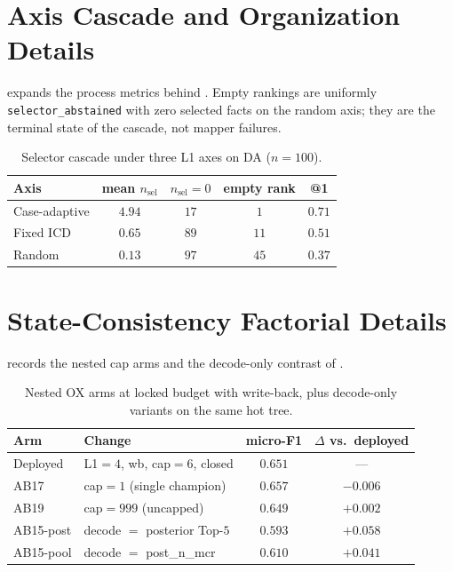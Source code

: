 \section{Axis Cascade and Organization Details}
\label{app:org-axis}

 expands the process metrics behind .
Empty rankings are uniformly \texttt{selector\_abstained} with zero selected facts on the random axis; they are the terminal state of the cascade, not mapper failures.

\begin{table}[t]
\centering
\small
\caption{Selector cascade under three L1 axes on DA ($n{=}100$).}
\label{tab:org-cascade}
\begin{tabular}{lcccc}
\toprule
Axis & mean $n_{\mathrm{sel}}$ & $n_{\mathrm{sel}}{=}0$ & empty rank & @1 \\
\midrule
Case-adaptive & $4.94$ & $17$ & $1$ & $0.71$ \\
Fixed ICD & $0.65$ & $89$ & $11$ & $0.51$ \\
Random & $0.13$ & $97$ & $45$ & $0.37$ \\
\bottomrule
\end{tabular}
\end{table}

\section{State-Consistency Factorial Details}
\label{app:state-fact}

 records the nested cap arms and the decode-only contrast of .

\begin{table}[t]
\centering
\small
\caption{Nested OX arms at locked budget with write-back, plus decode-only variants on the same hot tree.}
\label{tab:state-detail}
\begin{tabular}{llcc}
\toprule
Arm & Change & micro-F1 & $\Delta$ vs.\ deployed \\
\midrule
Deployed & L1${=}4$, wb, cap${=}6$, closed & $0.651$ & --- \\
AB17 & cap${=}1$ (single champion) & $0.657$ & $-0.006$ \\
AB19 & cap${=}999$ (uncapped) & $0.649$ & $+0.002$ \\
AB15-post & decode ${=}$ posterior Top-$5$ & $0.593$ & $+0.058$ \\
AB15-pool & decode ${=}$ post\_n\_mcr & $0.610$ & $+0.041$ \\
\bottomrule
\end{tabular}
\end{table}

